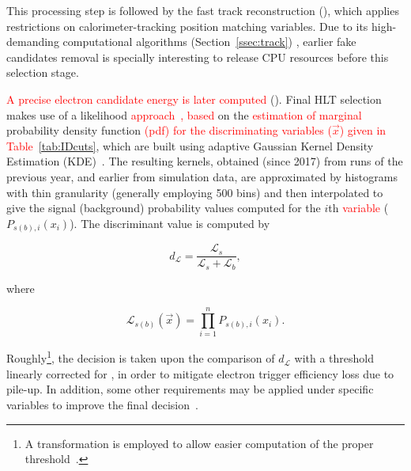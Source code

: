   
  
  
This processing step is followed by the fast track reconstruction
(\fastelectron), which applies restrictions on calorimeter-tracking position
matching variables. Due to its high-demanding computational algorithms (Section~\ref{ssec:track})
, earlier fake candidates removal is specially
interesting to release CPU resources before this selection stage.


\textcolor{red}{A precise electron candidate energy is later computed} (\hltcalo). Final HLT selection makes use of a likelihood
\textcolor{red}{approach~\cite{ATL-COM-PHYS-2017-1012,ATLAS-PERF-2017-01-002}, based} on the \textcolor{red}{estimation of marginal} probability density function \textcolor{red}{(pdf) for the discriminating variables ($\vec{x}$) given in Table~\ref{tab:IDcuts}}, which are built using adaptive Gaussian Kernel Density Estimation (KDE)~\cite{Silverman2018,TMVA}. The
resulting kernels, obtained (since 2017) from runs of the previous year, and
earlier from simulation data, are approximated by histograms with thin
granularity (generally employing 500 bins) and then interpolated to give the
signal (background) probability values computed for the $i$th \textcolor{red}{variable}
($P_{s(b),i}(x_i)$). The discriminant value is computed by

\begin{equation}
  d_{\mathcal{L}} = \frac{\mathcal{L}_{s}}{\mathcal{L}_{s} + \mathcal{L}_{b}},
\end{equation}
  
\noindent where
  
\begin{equation}
\mathcal{L}_{s(b)}(\vec{x}) = \prod_{i=1}^{n} P_{s(b),i}(x_i).
\label{eq:likelihoods}
\end{equation}

\noindent Roughly\footnote{A transformation is employed to allow
easier computation of the proper threshold~\cite{aaboud2019electron}.},
the decision is taken upon the comparison of $d_{\mathcal{L}}$ with a
threshold linearly corrected for \avgmu{}, in order to mitigate electron trigger
efficiency loss due to pile-up. In addition, some other requirements may be
applied under specific variables to improve the final
decision~\cite{aaboud2019electron}.

